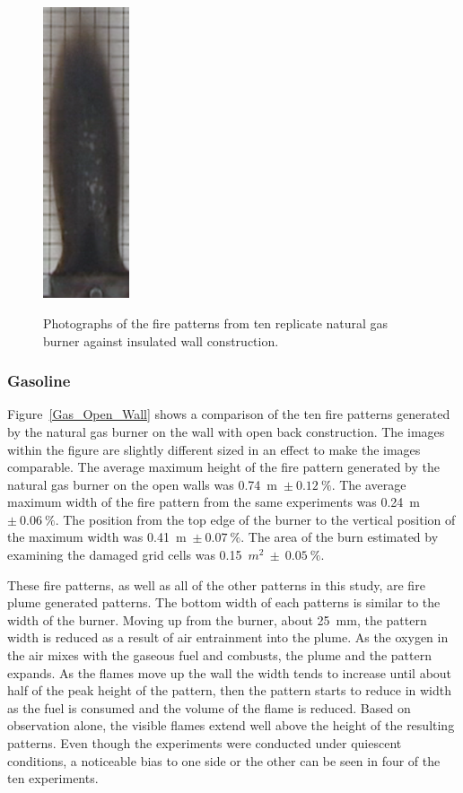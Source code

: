 \documentclass[twoside]{uocthesis}
\begin{document}
\begin{figure}[p]
	\includegraphics[width=1.0in]{../Figures/GBNG33} \\

	\caption[Photographs of the fire patterns from ten replicate natural gas burner against insulated wall construction]{Photographs of the fire patterns from ten replicate natural gas burner against insulated wall construction.}
	\label{NG_Insulated_Wall}
\end{figure}



\subsubsection{Gasoline}

Figure~\ref{Gas_Open_Wall} shows a comparison of the ten fire patterns generated by the natural gas burner on the wall with open back construction.  The images within the figure are slightly different sized in an effect to make the images comparable.
The average maximum height of the fire pattern generated by the natural gas burner on the open walls was 0.74~m~$\pm~0.12~\%$.  The average maximum width of the fire pattern from the same experiments was 0.24~m~$\pm~0.06~\%$.  The position from the top edge of the burner to the vertical position of the maximum width was 0.41~m~$\pm~0.07~\%$. The area of the burn estimated by examining the damaged grid cells was 0.15~$m^2~\pm~0.05~\%$.  

These fire patterns, as well as all of the other patterns in this study, are fire plume generated patterns. The bottom width of each patterns is similar to the width of the burner. Moving up from the burner, about 25~mm, the pattern width is reduced as a result of air entrainment into the plume.  As the oxygen in the air mixes with the gaseous fuel and combusts, the plume and the pattern expands.  As the flames move up the wall the width tends to increase until about half of the peak height of the pattern, then the pattern starts to reduce in width as the fuel is consumed and the volume of the flame is reduced.  Based on observation alone, the visible flames extend well above the height of the resulting patterns.  Even though the experiments were conducted under quiescent conditions, a noticeable bias to one side or the other can be seen in four of the ten experiments.           
\end{document}
